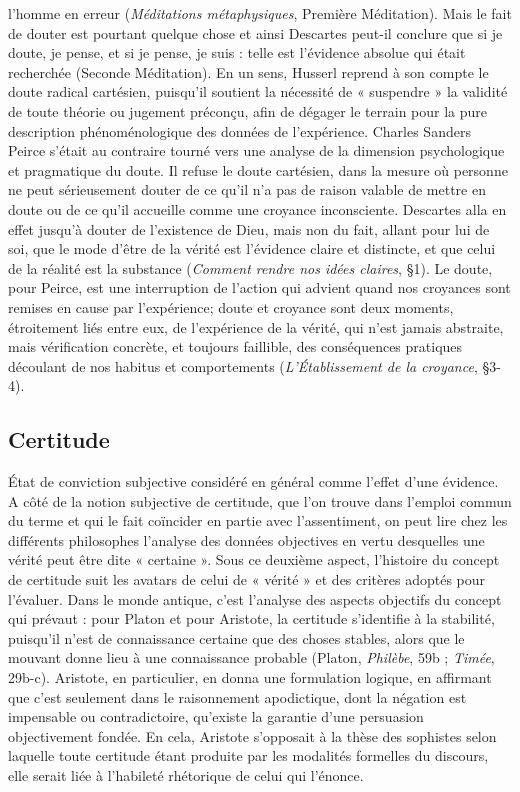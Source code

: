 l’homme en erreur ({\it Méditations métaphysiques},
Première Méditation). Mais le fait
de douter est pourtant quelque chose et
ainsi Descartes peut-il conclure que si je
doute, je pense, et si je pense, je suis : telle
est l'évidence absolue qui était recherchée
(Seconde Méditation). En un sens, Husserl
reprend à son compte le doute radical
cartésien, puisqu'il soutient la nécessité
de « suspendre » la validité de toute théorie
ou jugement préconçu, afin de dégager
le terrain pour la pure description phénoménologique
des données de l’expérience.
Charles Sanders Peirce s’était au
contraire tourné vers une analyse de la
dimension psychologique et pragmatique
du doute. Il refuse le doute cartésien,
dans la mesure où personne ne peut
sérieusement douter de ce qu’il n’a pas de
raison valable de mettre en doute ou de
ce qu’il accueille comme une croyance
inconsciente. Descartes alla en effet jusqu’à
douter de l’existence de Dieu, mais
non du fait, allant pour lui de soi, que le
mode d’être de la vérité est l’évidence
claire et distincte, et que celui de la réalité
est la substance ({\it Comment rendre nos
idées claires}, \S 1). Le doute, pour Peirce,
est une interruption de l’action qui
advient quand nos croyances sont remises
en cause par l'expérience; doute et
croyance sont deux moments, étroitement
liés entre eux, de l'expérience de la vérité,
qui n’est jamais abstraite, mais vérification
concrète, et toujours faillible, des
conséquences pratiques découlant de nos
habitus et comportements ({\it L'Établissement
de la croyance}, \S 3-4).


\subsection{Certitude}
%
État de conviction subjective
considéré en général comme l'effet d’une
évidence. A côté de la notion subjective de
certitude, que l’on trouve dans l’emploi
commun du terme et qui le fait coïncider
en partie avec l’assentiment, on peut lire
chez les différents philosophes l’analyse
des données objectives en vertu desquelles
une vérité peut être dite « certaine ». Sous
ce deuxième aspect, l’histoire du concept
de certitude suit les avatars de celui de
« vérité » et des critères adoptés pour
l’évaluer. Dans le monde antique, c’est
l'analyse des aspects objectifs du concept
qui prévaut : pour Platon et pour Aristote,
la certitude s’identifie à la stabilité, puisqu’il
n’est de connaissance certaine que
des choses stables, alors que le mouvant
donne lieu à une connaissance probable
(Platon, {\it Philèbe}, 59b ; {\it Timée}, 29b-c).
Aristote, en particulier, en donna une
formulation logique, en affirmant que c’est
%
seulement dans le raisonnement apodictique,
dont la négation est impensable ou
contradictoire, qu’existe la garantie d’une
persuasion objectivement fondée. En cela,
Aristote s’opposait à la thèse des sophistes
selon laquelle toute certitude étant produite
par les modalités formelles du discours,
elle serait liée à l’habileté rhétorique
de celui qui l’énonce.

